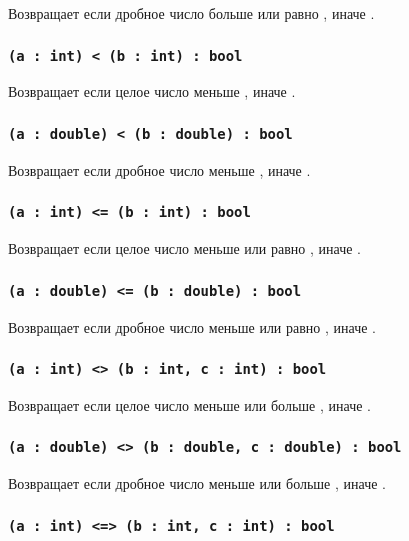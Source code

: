 Возвращает \true{} если дробное число  больше или равно , иначе \false{}.

\subsubsection{\lstinline|(a : int) < (b : int) : bool|}

Возвращает \true{} если целое число  меньше , иначе \false{}.

\subsubsection{\lstinline|(a : double) < (b : double) : bool|}

Возвращает \true{} если дробное число  меньше , иначе \false{}.

\subsubsection{\lstinline|(a : int) <= (b : int) : bool|}

Возвращает \true{} если целое число  меньше или равно , иначе \false{}.

\subsubsection{\lstinline|(a : double) <= (b : double) : bool|}

Возвращает \true{} если дробное число  меньше или равно , иначе \false{}.

\subsubsection{\lstinline|(a : int) <> (b : int, c : int) : bool|}

Возвращает \true{} если целое число  меньше  или больше , иначе \false{}.

\subsubsection{\lstinline|(a : double) <> (b : double, c : double) : bool|}

Возвращает \true{} если дробное число  меньше  или больше , иначе \false{}.

\subsubsection{\lstinline|(a : int) <=> (b : int, c : int) : bool|}

